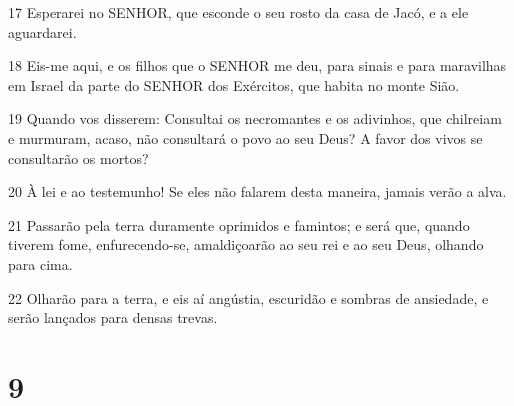 \par 17 Esperarei no SENHOR, que esconde o seu rosto da casa de Jacó, e a ele aguardarei.
\par 18 Eis-me aqui, e os filhos que o SENHOR me deu, para sinais e para maravilhas em Israel da parte do SENHOR dos Exércitos, que habita no monte Sião.
\par 19 Quando vos disserem: Consultai os necromantes e os adivinhos, que chilreiam e murmuram, acaso, não consultará o povo ao seu Deus? A favor dos vivos se consultarão os mortos?
\par 20 À lei e ao testemunho! Se eles não falarem desta maneira, jamais verão a alva.
\par 21 Passarão pela terra duramente oprimidos e famintos; e será que, quando tiverem fome, enfurecendo-se, amaldiçoarão ao seu rei e ao seu Deus, olhando para cima.
\par 22 Olharão para a terra, e eis aí angústia, escuridão e sombras de ansiedade, e serão lançados para densas trevas.

\chapter{9}


